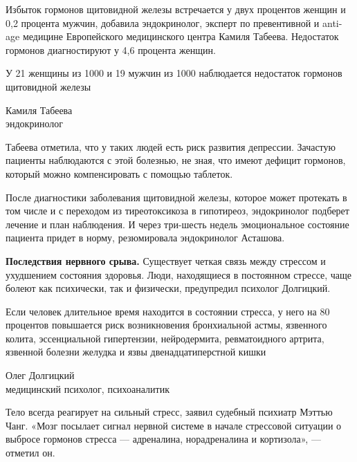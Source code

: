 Избыток гормонов щитовидной железы встречается у двух процентов женщин и 0,2 процента мужчин, добавила эндокринолог, эксперт по превентивной и anti-age медицине Европейского медицинского центра Камиля Табеева. Недостаток гормонов диагностируют у 4,6 процента женщин.

\begin{fancyquotes}
    У 21 женщины из 1000 и 19 мужчин из 1000 наблюдается недостаток гормонов щитовидной железы\\

    \begin{flushright}
        Камиля Табеева\\
        эндокринолог
    \end{flushright}
\end{fancyquotes}

Табеева отметила, что у таких людей есть риск развития депрессии. Зачастую пациенты наблюдаются с этой болезнью, не зная, что имеют дефицит гормонов, который можно компенсировать с помощью таблеток.

После диагностики заболевания щитовидной железы, которое может протекать в том числе и с переходом из тиреотоксикоза в гипотиреоз, эндокринолог подберет лечение и план наблюдения. И через три-шесть недель эмоциональное состояние пациента придет в норму, резюмировала эндокринолог Асташова.

\textbf{Последствия нервного срыва.}
Существует четкая связь между стрессом и ухудшением состояния здоровья. Люди, находящиеся в постоянном стрессе, чаще болеют как психически, так и физически, предупредил психолог Долгицкий.

\begin{fancyquotes}
    Если человек длительное время находится в состоянии стресса, у него на 80 процентов повышается риск возникновения бронхиальной астмы, язвенного колита, эссенциальной гипертензии, нейродермита, ревматоидного артрита, язвенной болезни желудка и язвы двенадцатиперстной кишки\\

    \begin{flushright}
        Олег Долгицкий\\
        медицинский психолог, психоаналитик
    \end{flushright}
\end{fancyquotes}

Тело всегда реагирует на сильный стресс, заявил судебный психиатр Мэттью Чанг. «Мозг посылает сигнал нервной системе в начале стрессовой ситуации о выбросе гормонов стресса  ---  адреналина, норадреналина и кортизола»,  ---  отметил он.

